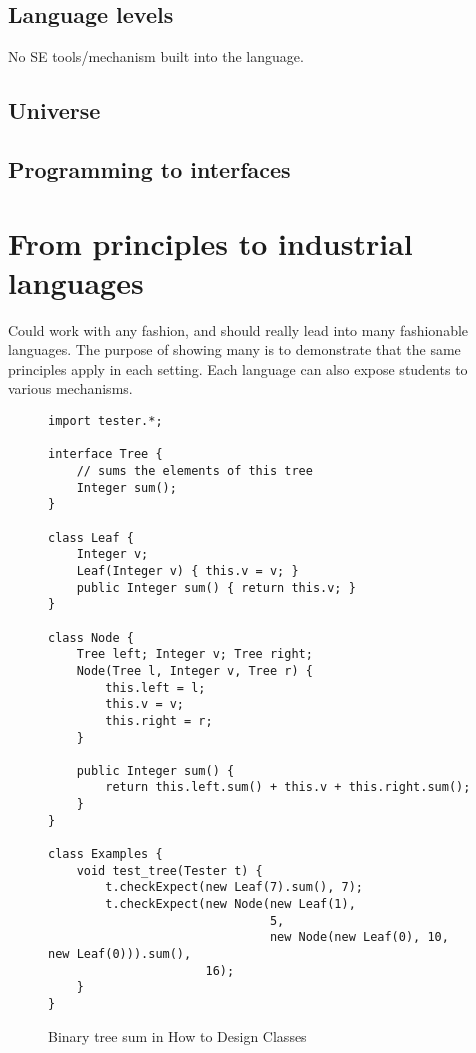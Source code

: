 \documentclass[submission,copyright]{eptcs}
\begin{document}
\subsection{Language levels}

No SE tools/mechanism built into the language.

\subsection{Universe}

\subsection{Programming to interfaces}








\section{From principles to industrial languages}
\label{sec:industrial}

Could work with any fashion, and should really lead into many
fashionable languages.  The purpose of showing many is to demonstrate
that the same principles apply in each setting.  Each language can also
expose students to various mechanisms.

\begin{figure}
\begin{verbatim}
import tester.*;

interface Tree {
    // sums the elements of this tree
    Integer sum();
}

class Leaf {
    Integer v;
    Leaf(Integer v) { this.v = v; }
    public Integer sum() { return this.v; }
}

class Node {
    Tree left; Integer v; Tree right;
    Node(Tree l, Integer v, Tree r) {
        this.left = l;
        this.v = v;
        this.right = r;
    }

    public Integer sum() {
        return this.left.sum() + this.v + this.right.sum();
    }
}

class Examples {
    void test_tree(Tester t) {
        t.checkExpect(new Leaf(7).sum(), 7);
        t.checkExpect(new Node(new Leaf(1),
                               5, 
                               new Node(new Leaf(0), 10, new Leaf(0))).sum(),
                      16);
    }
}
\end{verbatim}
\caption{Binary tree sum in How to Design Classes}
\end{figure}
\end{document}
